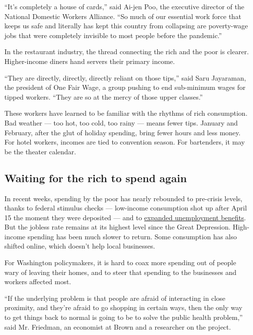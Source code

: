 ``It's completely a house of cards,'' said Ai-jen Poo, the executive
director of the National Domestic Workers Alliance. ``So much of our
essential work force that keeps us safe and literally has kept this
country from collapsing are poverty-wage jobs that were completely
invisible to most people before the pandemic.''

In the restaurant industry, the thread connecting the rich and the poor
is clearer. Higher-income diners hand servers their primary income.

``They are directly, directly, directly reliant on those tips,'' said
Saru Jayaraman, the president of One Fair Wage, a group pushing to end
sub-minimum wages for tipped workers. ``They are so at the mercy of
those upper classes.''

These workers have learned to be familiar with the rhythms of rich
consumption. Bad weather --- too hot, too cold, too rainy --- means
fewer tips. January and February, after the glut of holiday spending,
bring fewer hours and less money. For hotel workers, incomes are tied to
convention season. For bartenders, it may be the theater calendar.

\hypertarget{waiting-for-the-rich-to-spend-again}{%
\subsection{Waiting for the rich to spend
again}\label{waiting-for-the-rich-to-spend-again}}

In recent weeks, spending by the poor has nearly rebounded to pre-crisis
levels, thanks to federal stimulus checks --- low-income consumption
shot up after April 15 the moment they were deposited --- and to
\href{https://www.nytimes3xbfgragh.onion/interactive/2020/04/23/business/economy/unemployment-benefits-stimulus-coronavirus.html}{expanded
unemployment benefits}. But the jobless rate remains at its highest
level since the Great Depression. High-income spending has been much
slower to return. Some consumption has also shifted online, which
doesn't help local businesses.

For Washington policymakers, it is hard to coax more spending out of
people wary of leaving their homes, and to steer that spending to the
businesses and workers affected most.

``If the underlying problem is that people are afraid of interacting in
close proximity, and they're afraid to go shopping in certain ways, then
the only way to get things back to normal is going to be to solve the
public health problem,'' said Mr. Friedman, an economist at Brown and a
researcher on the project.

